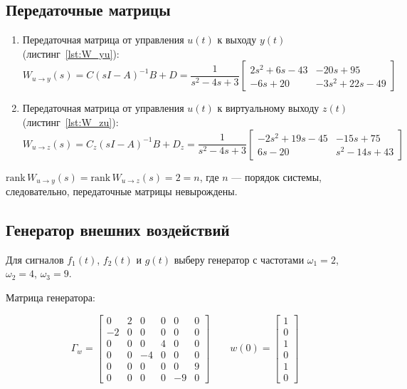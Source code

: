 \documentclass[a4paper,12pt]{article}
\begin{document}
	\subsection{Передаточные матрицы}
	
	\begin{enumerate}
		
		\item Передаточная матрица от управления $u(t)$ к выходу $y(t)$ (листинг~\ref{lst:W_yu}):
		\[
		W_{u \rightarrow y}(s) = C(sI - A)^{-1}B + D =
		\frac{1}{s^2-4s+3}
		\begin{bmatrix}
			2s^2+6s-43 & -20s+95\\
			-6s+20 & -3s^2+22s-49
		\end{bmatrix}
		\]
		
		\item Передаточная матрица от управления \(u(t)\) к виртуальному выходу \(z(t)\) (листинг~\ref{lst:W_zu}):
		\[
		W_{u \rightarrow z}(s) = C_z(sI - A)^{-1}B + D_z =
		\frac{1}{s^2-4s+3}
		\begin{bmatrix}
			-2s^2+19s-45 & -15s+75\\
			6s-20 & s^2-14s+43
		\end{bmatrix}
		\]
		
	\end{enumerate}
	
	\(\text{rank}\,W_{u \to y}(s) = \text{rank}\,W_{u \to z}(s) = 2 = n\), где \(n\) --- порядок системы, следовательно, передаточные матрицы невырождены.
	
	
	\subsection{Генератор внешних воздействий}
	
	Для сигналов $f_1(t)$, $f_2(t)$ и $g(t)$ выберу генератор с частотами $\omega_1 = 2$, $\omega_2 = 4$, $\omega_3 = 9$.
	
	Матрица генератора:
	
	\[
	\Gamma_w =
	\begin{bmatrix}
		0 & 2 & 0 & 0 & 0 & 0 \\
		-2 & 0 & 0 & 0 & 0 & 0 \\
		0 & 0 & 0 & 4 & 0 & 0 \\
		0 & 0 & -4 & 0 & 0 & 0 \\
		0 & 0 & 0 & 0 & 0 & 9 \\
		0 & 0 & 0 & 0 & -9 & 0
	\end{bmatrix} \qquad
	w(0) = 
	\begin{bmatrix}
		1 \\ 0 \\ 1 \\ 0 \\ 1 \\ 0
	\end{bmatrix}
	\]
	
\end{document}
